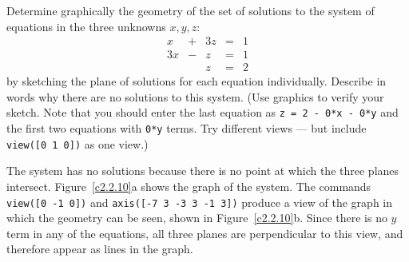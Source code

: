 \documentclass{ximera}
\begin{document}
\begin{exercise} \label{c2.2.10}
Determine graphically the geometry of the set of solutions to the
system of equations in the three unknowns $x,y,z$:
\[
\begin{array}{rcrcr}
  x & + & 3z  & = & 1\\
 3x & - &  z  & = & 1\\
    &   &  z  & = & 2
\end{array}
\]
by sketching the plane of solutions for each equation individually.
Describe in words why there are no solutions to this system.
(Use \Matlab graphics to verify your sketch.  Note that you should
enter the last equation as {\tt z = 2 - 0*x - 0*y} and the first two
equations with {\tt 0*y} terms.  Try different views --- but include
{\tt view([0 1 0])} as one view.)

\begin{solution}

The system has no solutions because there is no point at which the three
planes intersect.  Figure~\ref{c2.2.10}a shows the \Matlab graph of
the system.  The commands {\tt view([0 -1 0])} and 
{\tt axis([-7 3 -3 3 -1 3])}
produce a view of the graph in which the geometry
can be seen, shown in Figure~\ref{c2.2.10}b.
Since there is no $y$ term in any of the equations, all three planes
are perpendicular to this view, and therefore appear as lines in the
graph.

\begin{figure}[htb]
                       \centerline{%
                       }
\end{figure}





\end{solution}
\end{exercise}
\end{document}
